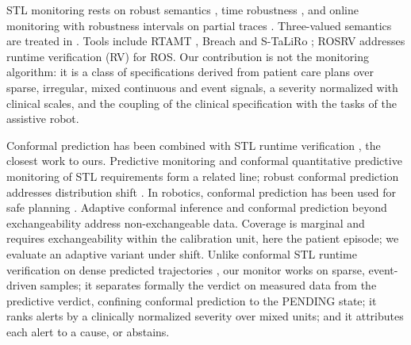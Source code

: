 STL monitoring rests on robust semantics \cite{fainekos-pappas-robustness,donze-maler-robust}, time robustness \cite{donze-maler-robust}, and online monitoring with robustness intervals on partial traces \cite{deshmukh-online-monitoring-conf}. Three-valued semantics are treated in \cite{bauer-leucker-schallhart-three-valued}. Tools include RTAMT \cite{nickovic-yamaguchi-rtamt}, Breach \cite{breach-tool} and S-TaLiRo \cite{staliro-tool}; ROSRV \cite{huang-rosrv} addresses runtime verification (RV) for ROS.
Our contribution is not the monitoring algorithm: it is a class of specifications derived from patient care plans over sparse, irregular, mixed continuous and event signals, a severity normalized with clinical scales, and the coupling of the clinical specification with the tasks of the assistive robot.

Conformal prediction has been combined with STL runtime verification \cite{lindemann-conformal-stl}, the closest work to ours. Predictive monitoring \cite{bortolussi-neural-predictive-monitoring-conf} and conformal quantitative predictive monitoring of STL requirements \cite{cairoli-conformal-quantitative-monitoring} form a related line; robust conformal prediction addresses distribution shift \cite{zhao-robust-conformal-stl}. In robotics, conformal prediction has been used for safe planning \cite{lindemann-safe-planning}. Adaptive conformal inference \cite{gibbs-candes-adaptive-conformal} and conformal prediction beyond exchangeability \cite{barber-beyond-exchangeability} address non-exchangeable data. Coverage is marginal and requires exchangeability within the calibration unit, here the patient episode; we evaluate an adaptive variant under shift.
Unlike conformal STL runtime verification on dense predicted trajectories \cite{lindemann-conformal-stl}, our monitor works on sparse, event-driven samples; it separates formally the verdict on measured data from the predictive verdict, confining conformal prediction to the PENDING state; it ranks alerts by a clinically normalized severity over mixed units; and it attributes each alert to a cause, or abstains.

